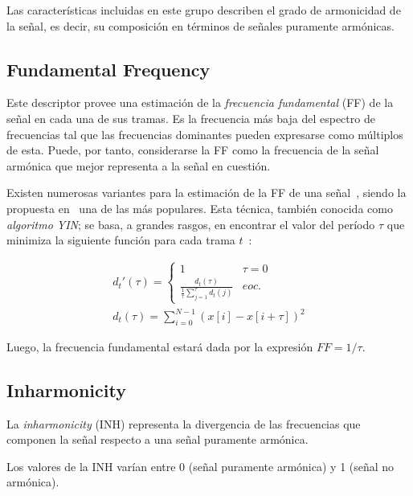 Las características incluidas en este grupo describen el grado de armonicidad de la señal, es decir, su composición en términos de señales puramente armónicas.

\subsection{Fundamental Frequency}\label{subsec:fundamentalFrequency}

Este descriptor provee una estimación de la \textit{frecuencia fundamental} (FF) de la señal en cada una de sus tramas.
Es la frecuencia más baja del espectro de frecuencias tal que las frecuencias dominantes pueden expresarse como múltiplos de esta.
Puede, por tanto, considerarse la FF como la frecuencia de la señal armónica que mejor representa a la señal en cuestión.

Existen numerosas variantes para la estimación de la FF de una señal~\cite{Kim05}, siendo la propuesta en~\cite{Cheveigne02} una de las más populares.
Esta técnica, también conocida como \textit{algoritmo YIN};
se basa, a grandes rasgos, en encontrar el valor del período $\tau$ que minimiza la siguiente función para cada trama $t$~\cite{Gerhard03-2}:

\begin{gather}
    \label{eq:YIN}
    d_t'(\tau) = \begin{cases}
                     1 & \tau = 0 \\
                     \frac{d_t(\tau)}{\frac{1}{\tau}{\sum_{j=1}^{\tau}{d_t(j)}}} & eoc.
    \end{cases}\\
    d_t(\tau) = \sum_{i=0}^{N-1}{(x[i]-x[i+\tau])^2}
\end{gather}

Luego, la frecuencia fundamental estará dada por la expresión $FF = 1/\tau$.

\subsection{Inharmonicity}\label{subsec:inharmonicity}

La \textit{inharmonicity} (INH) representa la divergencia de las frecuencias que componen la señal respecto a una señal puramente armónica.


Los valores de la INH varían entre 0 (señal puramente armónica) y 1 (señal no armónica).

